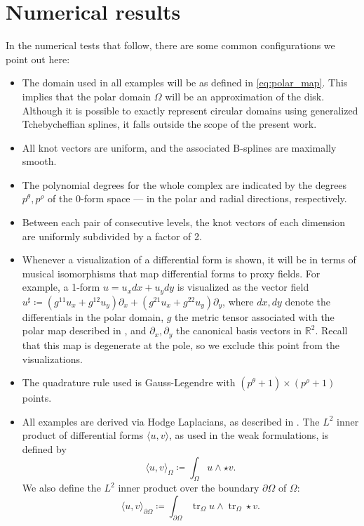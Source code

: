 \documentclass[10pt]{article}
\providecommand{\tikzexternaldisable}{}
\newcommand{\RR}{{\mathbb{R}}}
\DeclareMathOperator{\trace}{tr}
\theoremstyle{plain}
\theoremstyle{definition}
\theoremstyle{remark}
\begin{document}
\section{Numerical results}
\tikzexternaldisable
\label{sec:numerics}

In the numerical tests that follow, there are some common configurations we point out here:

\begin{itemize}
    \item The domain used in all examples will be as defined in \eqref{eq:polar_map}. This
        implies that the polar domain \(\Omega\) will be an approximation of the disk.
        Although it is possible to exactly represent circular domains using generalized
        Tchebycheffian splines, it falls outside the scope of the present work. 
    \item All knot vectors are uniform, and the associated B-splines are maximally smooth.
    \item The polynomial degrees for the whole complex are indicated by the degrees
        \(p^{\theta}, p^{\rho}\) of the 0-form space --- in the polar and radial directions,
        respectively.
    \item Between each pair of consecutive levels, the knot vectors of each dimension are
        uniformly subdivided by a factor of 2.
    \item Whenever a visualization of a differential form is shown, it will be in terms of
        musical isomorphisms that map differential forms to proxy fields. For example, a
        1-form \(u=u_{x}dx+u_{y}dy\) is visualized as the vector field
        \(u^{\sharp}\coloneqq \left(g^{11}u_{x}+g^{12}u_{y}\right)\partial_{x} +
        \left(g^{21}u_{x}+g^{22}u_{y}\right)\partial_{y}\), where \(dx,dy\) denote the
        differentials in the polar domain, \(g\) the metric tensor associated with the polar
        map described in , and \(\partial_x, \partial_y\) the
        canonical basis vectors in \(\RR^2\). Recall that this map is degenerate at the
        pole, so we exclude this point from the visualizations.
    \item The quadrature rule used is Gauss-Legendre with \((p^{\theta}+1) \times
        (p^{\rho}+1)\) points. 
    \item All examples are derived via Hodge Laplacians, as described in \cite[Section
        3.2]{Arnold:2010}. The \(L^2\) inner product of differential
        forms \(\langle u, v\rangle\), as used in the weak formulations, is defined by
        \[
            \langle u, v \rangle_{\Omega} \coloneqq \int_{\Omega} u \wedge \star v.
        \]
        We also define the \(L^2\) inner product over the boundary \(\partial \Omega\) of
        \(\Omega\):
        \[
            \langle u, v \rangle_{\partial \Omega} \coloneqq \int_{\partial\Omega}
            \trace_{\Omega} u \wedge \trace_{\Omega} \star v.
        \]
\end{itemize}
\end{document}

